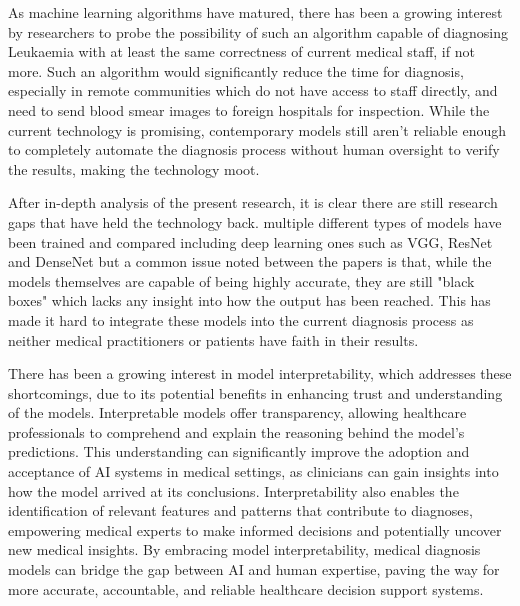 \documentclass[
	a4paper,
	10pt,
	unnumberedsections,
	twoside,
]{research_article}
\begin{document}
As machine learning algorithms have matured, there has been a growing interest by researchers to probe the possibility of such an algorithm capable of diagnosing Leukaemia with at least the same correctness of current medical staff, if not more. Such an algorithm would significantly reduce the time for diagnosis, especially in remote communities which do not have access to staff directly, and need to send blood smear images to foreign hospitals for inspection. While the current technology is promising, contemporary models still aren't reliable enough to completely automate the diagnosis process without human oversight to verify the results, making the technology moot.

After in-depth analysis of the present research, it is clear there are still research gaps that have held the technology back. multiple different types of models have been trained and compared including deep learning ones such as VGG, ResNet and DenseNet but a common issue noted between the papers is that, while the models themselves are capable of being highly accurate, they are still "black boxes" which lacks any insight into how the output has been reached. This has made it hard to integrate these models into the current diagnosis process as neither medical practitioners or patients have faith in their results.

There has been a growing interest in model interpretability, which addresses these shortcomings, due to its potential benefits in enhancing trust and understanding of the models. Interpretable models offer transparency, allowing healthcare professionals to comprehend and explain the reasoning behind the model's predictions. This understanding can significantly improve the adoption and acceptance of AI systems in medical settings, as clinicians can gain insights into how the model arrived at its conclusions. Interpretability also enables the identification of relevant features and patterns that contribute to diagnoses, empowering medical experts to make informed decisions and potentially uncover new medical insights. By embracing model interpretability, medical diagnosis models can bridge the gap between AI and human expertise, paving the way for more accurate, accountable, and reliable healthcare decision support systems.
\end{document}
